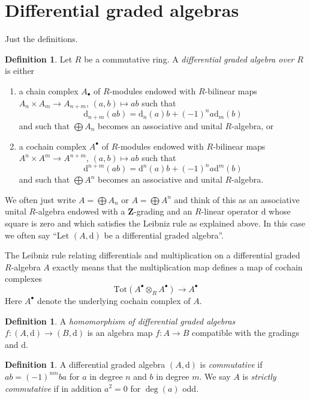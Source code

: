 \documentclass{stacks-project}
\theoremstyle{plain}
\theoremstyle{definition}
\newtheorem{definition}[subsection]{Definition}
\theoremstyle{remark}
\numberwithin{equation}{subsection}
\begin{document}
\section{Differential graded algebras}
\label{section-dga}


\noindent
Just the definitions.

\begin{definition}
\label{definition-dga}
Let $R$ be a commutative ring. A {\it differential graded algebra over $R$}
is either
\begin{enumerate}
\item a chain complex $A_\bullet$ of $R$-modules endowed with
$R$-bilinear maps $A_n \times A_m \to A_{n + m}$,
$(a, b) \mapsto ab$ such that
$$
\text{d}_{n + m}(ab) = \text{d}_n(a)b + (-1)^n a\text{d}_m(b)
$$
and such that $\bigoplus A_n$ becomes an associative and unital
$R$-algebra, or
\item a cochain complex $A^\bullet$ of $R$-modules endowed with
$R$-bilinear maps $A^n \times A^m \to A^{n + m}$, $(a, b) \mapsto ab$
such that
$$
\text{d}^{n + m}(ab) = \text{d}^n(a)b + (-1)^n a\text{d}^m(b)
$$
and such that $\bigoplus A^n$ becomes an associative and unital $R$-algebra.
\end{enumerate}
\end{definition}

\noindent
We often just write $A = \bigoplus A_n$ or $A = \bigoplus A^n$ and
think of this as an associative unital $R$-algebra endowed with a
$\mathbf{Z}$-grading and an $R$-linear operator $\text{d}$ whose square
is zero and which satisfies the Leibniz rule as explained above. In this case
we often say ``Let $(A, \text{d})$ be a differential graded algebra''.

\medskip\noindent
The Leibniz rule relating differentials and multiplication on a differential
graded $R$-algebra $A$ exactly means that the multiplication map defines
a map of cochain complexes
$$
\text{Tot}(A^\bullet \otimes_R A^\bullet) \to A^\bullet
$$
Here $A^\bullet$ denote the underlying cochain complex of $A$.

\begin{definition}
\label{definition-homomorphism-dga}
A {\it homomorphism of differential graded algebras}
$f : (A, \text{d}) \to (B, \text{d})$ is an algebra map $f : A \to B$
compatible with the gradings and $\text{d}$.
\end{definition}

\begin{definition}
\label{definition-cdga}
A differential graded algebra $(A, \text{d})$ is {\it commutative} if
$ab = (-1)^{nm}ba$ for $a$ in degree $n$ and $b$ in degree $m$.
We say $A$ is {\it strictly commutative} if in addition $a^2 = 0$
for $\deg(a)$ odd.
\end{definition}
\end{document}
